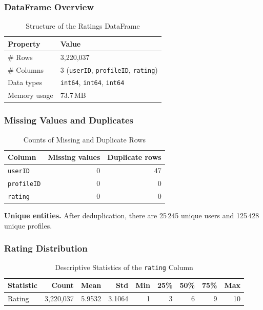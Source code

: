 \subsubsection*{DataFrame Overview}
\begin{table}[H]
\centering
\caption{Structure of the Ratings DataFrame}
\label{tab:df-overview}
\begin{tabular}{@{}ll@{}}
\toprule
Property        & Value                                             \\ 
\midrule
\# Rows         & 3{,}220{,}037                                     \\
\# Columns      & 3 (\texttt{userID}, \texttt{profileID}, \texttt{rating})    \\
Data types      & \texttt{int64}, \texttt{int64}, \texttt{int64}   \\
Memory usage    & 73.7\,MB                                          \\
\bottomrule
\end{tabular}
\end{table}

\subsubsection*{Missing Values and Duplicates}
\begin{table}[ht]
\centering
\caption{Counts of Missing and Duplicate Rows}
\label{tab:missing-dup}
\begin{tabular}{@{}lrr@{}}
\toprule
Column        & Missing values & Duplicate rows \\ 
\midrule
\texttt{userID}    & 0              & 47   \\
\texttt{profileID} & 0              & 0    \\
\texttt{rating}    & 0              & 0    \\
\bottomrule
\end{tabular}
\end{table}

\noindent\textbf{Unique entities.} After deduplication, there are 25\,245 unique users and 125\,428 unique profiles.

\subsubsection*{Rating Distribution}

\begin{table}[H]
    \centering
    \caption{Descriptive Statistics of the \texttt{rating} Column}
    \label{tab:rating-stats}
    \begin{tabular}{@{}lrrrrrrrr@{}}
    \toprule
    Statistic   & Count        & Mean   & Std    & Min & 25\% & 50\% & 75\% & Max \\ 
    \midrule
    Rating      & 3{,}220{,}037 & 5.9532 & 3.1064 & 1  & 3    & 6  & 9    & 10  \\
    \bottomrule
    \end{tabular}
\end{table}

